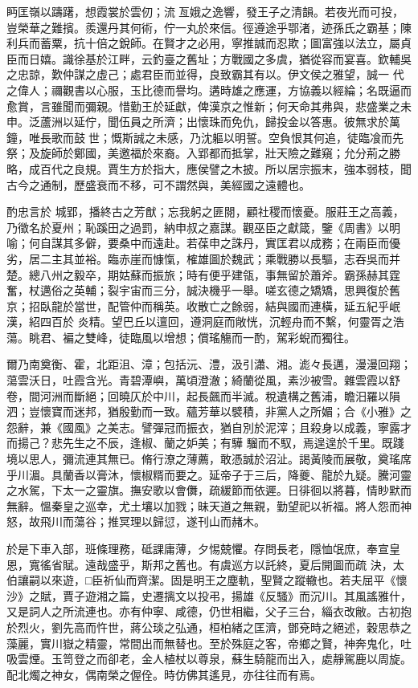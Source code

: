 \begin{pinyinscope}
 眄匡嶺以躊躇，想霞裳於雲仞；流亙娥之逸響，發王子之清韻。若夜光而可投，豈榮華之難擯。羨還丹其何術，佇一丸於來信。徑遵途乎鄂渚，迹孫氏之霸基；陳利兵而蓄粟，抗十倍之銳師。在賢才之必用，寧推誠而忍欺；圖富強以法立，屬貞臣而日嬉。識徐基於江畔，云釣臺之舊址；方戰國之多虞，猶從容而宴喜。欽輔吳之忠諒，歎仲謀之虛己；處君臣而並得，良致霸其有以。伊文侯之雅望，誠一
 代之偉人；禰觀書以心服，玉比德而譽均。遘時雄之應運，方協義以經綸；名既逼而愈賞，言雖聞而彌親。惜勤王於延獻，俾漢京之惟新；何天命其弗與，悲盛業之未申。泛蘆洲以延佇，聞伍員之所濟；出懷珠而免仇，歸投金以答惠。彼無求於萬鐘，唯長歌而鼓世；慨斯誠之未感，乃沈軀以明誓。空負恨其何追，徒臨飡而先祭；及旋師於鄭國，美邀福於來裔。入郢都而抵掌，壯天險之難窺；允分荊之勝略，成百代之良規。賈生方於指大，應侯譬之木披。所以居宗振末，強本弱枝，聞古今之通制，歷盛衰而不移，可不謂然與，美經國之遠體也。



 酌忠言於
 城郢，播終古之芳猷；忘我躬之匪閱，顧社稷而懷憂。服莊王之高義，乃徵名於夏州；恥蹊田之過罰，納申叔之嘉謀。觀巫臣之獻箴，鑒《周書》以明喻；何自謀其多僻，要桑中而遠赴。若葆申之誅丹，實匡君以成務；在兩臣而優劣，居二主其並裕。臨赤崖而慷愾，榷雄圖於魏武；乘戰勝以長驅，志吞吳而并楚。總八州之毅卒，期姑蘇而振旅；時有便乎建瓴，事無留於蕭斧。霸孫赫其霆奮，杖邁俗之英輔；裂宇宙而三分，誠決機乎一舉。嗟玄德之矯矯，思興復於舊京；招臥龍於當世，配管仲而稱英。收散亡之餘弱，結與國而連橫，延五紀乎岷漢，紹四百於
 炎精。望巴丘以邅回，遵洞庭而敞恍，沉輕舟而不繫，何靈胥之浩蕩。眺君、褊之雙峰，徒臨風以增想；償瑤觴而一酌，駕彩蜺而獨往。



 爾乃南奠衡、霍，北距沮、漳；包括沅、澧，汲引瀟、湘。滮々長邁，漫漫回翔；蕩雲沃日，吐霞含光。青碧潭嶼，萬頃澄澈；綺蘭從風，素沙被雪。雜雲霞以舒卷，間河洲而斷絕；回曉仄於中川，起長飆而半滅。稅遺構之舊浦，瞻汨羅以隕泗；豈懷寶而迷邦，猶殷勤而一致。蘊芳華以襞積，非黨人之所媚；合《小雅》之怨辭，兼《國風》之美志。譬彈冠而振衣，猶自別於泥滓；且殺身以成義，寧露才而揚己？悲先生之不辰，逢椒、蘭之妒美；有驊
 騮而不馭，焉遑遑於千里。既踐境以思人，彌流連其無已。脩行潦之薄薦，敢憑誠於沼沚。謁黃陵而展敬，奠瑤席乎川湄。具蘭香以膏沐，懷椒糈而要之。延帝子于三后，降夔、龍於九疑。騰河靈之水駕，下太一之靈旗。撫安歌以會儛，疏緩節而依遲。日徘徊以將暮，情眇默而無辭。慍秦皇之巡幸，尤土壤以加戮；昧天道之無親，勤望祀以祈福。將人怨而神怒，故飛川而蕩谷；推冥理以歸愆，遂刊山而赭木。



 於是下車入部，班條理務，砥課庸薄，夕惕兢懼。存問長老，隱恤氓庶，奉宣皇恩，寬徭省賦。遠哉盛乎，斯邦之舊也。有虞巡方以託終，夏后開圖而疏
 決，太伯讓嗣以來遊，□臣祈仙而齊潔。固是明王之塵軌，聖賢之蹤轍也。若夫屈平《懷沙》之賦，賈子遊湘之篇，史遷摛文以投弔，揚雄《反騷》而沉川。其風謠雅什，又是詞人之所流連也。亦有仲寧、咸德，仍世相繼，父子三台，緇衣改敝。古初抱於烈火，劉先高而忤世，蔣公琰之弘通，桓柏緒之匡濟，鄧兗時之絕述，穀思恭之藻麗，實川嶽之精靈，常間出而無替也。至於殊庭之客，帝鄉之賢，神奔鬼化，吐吸雲煙。玉笥登之而卻老，金人植杖以尊泉，蘇生騎龍而出入，處靜駕鹿以周旋。配北燭之神女，偶南榮之偓佺。時仿佛其遙見，亦往往而有焉。




\end{pinyinscope}
